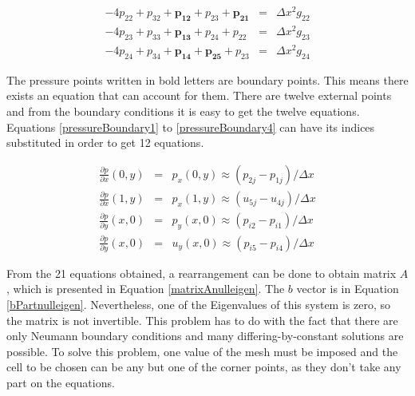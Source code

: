 \documentclass[journal]{IEEEtran}
\begin{document}
\begin{eqnarray}
-4p_{22} + p_{32} + \boldsymbol{p_{12}} + p_{23} + \boldsymbol{p_{21}} &=& \Delta x^2 g_{22} \label{internalPoissonEq1}\\
-4p_{23} + p_{33} + \boldsymbol{p_{13}} + p_{24} + p_{22} &=& \Delta x^2 g_{23}\label{internalPoissonEq2}\\
-4p_{24} + p_{34} + \boldsymbol{p_{14}} + \boldsymbol{p_{25}} + p_{23} &=& \Delta x^2 g_{24}\label{internalPoissonEq3}
\end{eqnarray}

The pressure points written in bold letters are boundary points. This means there exists an equation that can account for them. There are twelve external points and from the boundary conditions it is easy to get the twelve equations. Equations \ref{pressureBoundary1} to \ref{pressureBoundary4} can have its indices substituted in order to get 12 equations.

\begin{eqnarray}
\frac{\partial p}{\partial x}\left(0, y\right) &=& p_x\left(0, y\right)  \approx  (p_{2j} - p_{1j})/\Delta x \label{pressureBoundary1}\\
\frac{\partial p}{\partial x}\left(1, y\right) &=& p_x\left(1, y\right)  \approx  (u_{5j} - u_{4j})/\Delta x\\
\frac{\partial p}{\partial y}\left(x, 0\right) &=& p_y\left(x, 0\right)  \approx (p_{i2} - p_{i1})/\Delta x\\
\frac{\partial p}{\partial y}\left(x, 0\right) &=& u_y\left(x, 0\right)  \approx  (p_{i5} - p_{i4})/\Delta x\label{pressureBoundary4}
\end{eqnarray}

From the 21 equations obtained, a rearrangement can be done to obtain matrix $A$, which is presented in Equation \ref{matrixAnulleigen}. The $b$ vector is in Equation \ref{bPartnulleigen}. Nevertheless, one of the Eigenvalues of this system is zero, so the matrix is not invertible. This problem has to do with the fact that there are only Neumann boundary conditions and many differing-by-constant solutions are possible. To solve this problem, one value of the mesh must be imposed and the cell to be chosen can be any but one of the corner points, as they don't take any part on the equations. 
\end{document}

